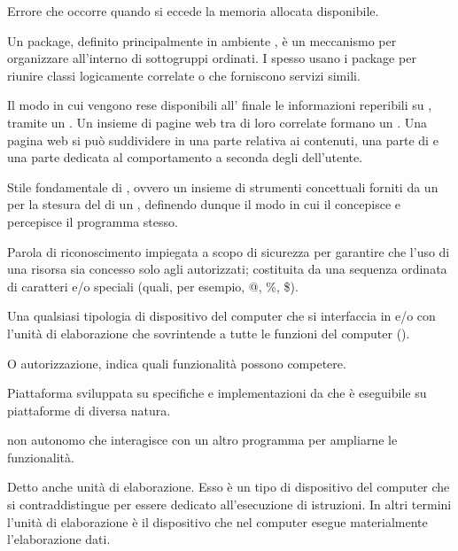 {Errore che occorre quando si eccede la memoria allocata disponibile.}




{Un package, definito principalmente in ambiente , è un meccanismo per organizzare  all'interno di sottogruppi ordinati. I  spesso usano i package per riunire classi logicamente correlate o che forniscono servizi simili.}

{Il modo in cui vengono rese disponibili all' finale le informazioni reperibili su , tramite un  . Un insieme di pagine web tra di loro correlate formano un . Una pagina web si può suddividere in una parte relativa ai contenuti, una parte di  e una parte dedicata al comportamento a seconda degli  dell'utente.}

{Stile fondamentale di , ovvero un insieme di strumenti concettuali forniti da un  per la stesura del  di un , definendo dunque il modo in cui il  concepisce e percepisce il programma stesso.}

{Parola di riconoscimento impiegata a scopo di sicurezza per garantire che l'uso di una risorsa sia concesso solo agli  autorizzati; costituita da una sequenza ordinata di caratteri  e/o speciali (quali, per esempio, @, \%, \$).}

{Una qualsiasi tipologia di dispositivo  del computer che si interfaccia in  e/o  con l'unità di elaborazione che sovrintende a tutte le funzioni del computer ().}

{O autorizzazione, indica quali funzionalità possono competere.}

{Piattaforma  sviluppata su specifiche e implementazioni da  che è eseguibile su piattaforme  di diversa natura.}

{ non autonomo che interagisce con un altro programma per ampliarne le funzionalità.}

{Detto anche unità di elaborazione. Esso è un tipo di dispositivo  del computer che si contraddistingue per essere dedicato all'esecuzione di istruzioni. In altri termini l'unità di elaborazione è il dispositivo che nel computer esegue materialmente l'elaborazione dati.}

